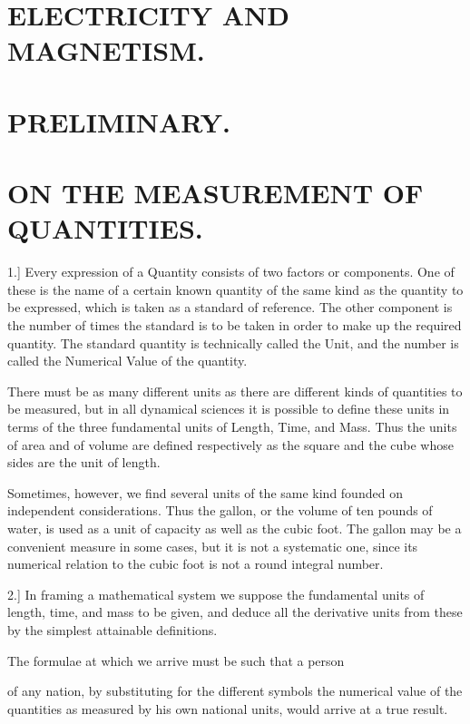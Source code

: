 \documentclass[11pt,a4paper]{article}
\begin{document}
\section*{ELECTRICITY AND MAGNETISM.}

\section*{PRELIMINARY.}

\section*{ON THE MEASUREMENT OF QUANTITIES.}

1.] Every expression of a Quantity consists of two factors or
components. One of these is the name of a certain known quantity
of the same kind as the quantity to be expressed, which is taken
as a standard of reference. The other component is the number of
times the standard is to be taken in order to make up the required
quantity. The standard quantity is technically called the Unit, and
the number is called the Numerical Value of the quantity.

There must be as many different units as there are different kinds
of quantities to be measured, but in all dynamical sciences it is
possible to define these units in terms of the three fundamental
units of Length, Time, and Mass. Thus the units of area and of
volume are defined respectively as the square and the cube whose
sides are the unit of length.

Sometimes, however, we find several units of the same kind founded
on independent considerations. Thus the gallon, or the volume of
ten pounds of water, is used as a unit of capacity as well as the
cubic foot. The gallon may be a convenient measure in some cases,
but it is not a systematic one, since its numerical relation to the
cubic foot is not a round integral number.

2.] In framing a mathematical system we suppose the fundamental
units of length, time, and mass to be given, and deduce all the
derivative units from these by the simplest attainable definitions.

The formulae at which we arrive must be such that a person

\clearpage

of any nation, by substituting for the different symbols the numerical
value of the quantities as measured by his own national units, would
arrive at a true result.
\end{document}

